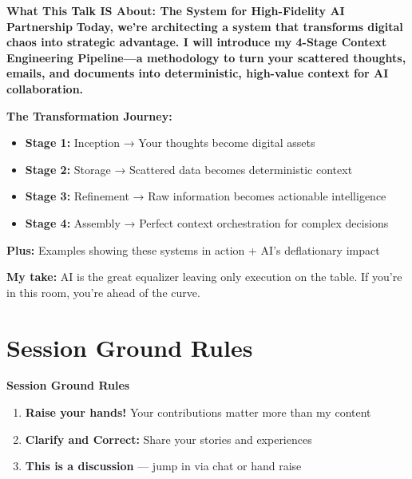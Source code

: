 \documentclass[
  ignorenonframetext,
  aspectratio=169,
]{beamer}
\providecommand{\tightlist}{%
  \setlength{\itemsep}{0pt}\setlength{\parskip}{0pt}}
\begin{document}
\begin{frame}{\textbf{What This Talk IS About: The System for
High-Fidelity AI Partnership }}
\label{what-this-talk-is-about-the-system-for-high-fidelity-ai-partnership}
\textbf{Today, we're architecting a system that transforms digital chaos
into strategic advantage. I will introduce my 4-Stage Context
Engineering Pipeline---a methodology to turn your scattered thoughts,
emails, and documents into deterministic, high-value context for AI
collaboration.}

\textbf{The Transformation Journey:}

\begin{itemize}
\tightlist
\item
  \textbf{Stage 1:} Inception → Your thoughts become digital assets
\item
  \textbf{Stage 2:} Storage → Scattered data becomes deterministic
  context\\
\item
  \textbf{Stage 3:} Refinement → Raw information becomes actionable
  intelligence
\item
  \textbf{Stage 4:} Assembly → Perfect context orchestration for complex
  decisions
\end{itemize}

\textbf{Plus:} Examples showing these systems in action + AI's
deflationary impact

\textbf{My take:} AI is the great equalizer leaving only execution on
the table. If you're in this room, you're ahead of the curve.
\end{frame}

\begin{frame}
\end{frame}

\section{\texorpdfstring{\textbf{Session Ground
Rules}}{Session Ground Rules}}\label{session-ground-rules}

\begin{frame}{\textbf{Session Ground Rules}}
\begin{enumerate}
\tightlist
\item
  \textbf{Raise your hands!} Your contributions matter more than my
  content
\item
  \textbf{Clarify and Correct:} Share your stories and experiences
\item
  \textbf{This is a discussion} --- jump in via chat or hand raise
\end{enumerate}
\end{frame}
\end{document}

